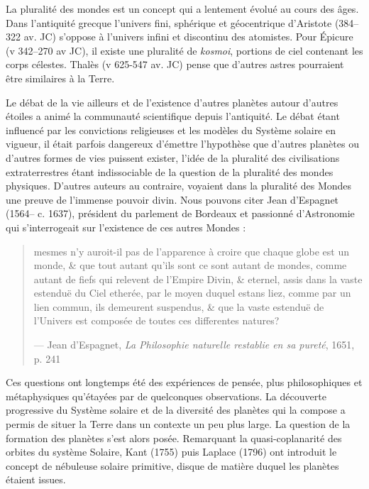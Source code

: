 La pluralité des mondes est un concept qui a lentement évolué au cours des âges. Dans l'antiquité grecque l'univers fini,
sphérique et géocentrique d'Aristote (384--322 av. JC) s'oppose à l'univers infini et discontinu des atomistes. Pour Épicure (v
342--270 av JC), il existe une pluralité de \textit{kosmoi}, portions de ciel contenant les corps célestes. Thalès (v 625-547
av. JC) pense que d'autres astres pourraient être similaires à la Terre. 

Le débat de la vie ailleurs et de l'existence d'autres planètes autour d'autres étoiles a animé la communauté scientifique
depuis l'antiquité. Le débat étant influencé par les convictions religieuses et les modèles du Système solaire en vigueur, il était
parfois dangereux d'émettre l'hypothèse que d'autres planètes ou d'autres formes de vies puissent exister, l'idée de la
pluralité des civilisations extraterrestres étant indissociable de la question de la pluralité des mondes physiques. D'autres auteurs au contraire, voyaient dans la pluralité des Mondes une preuve de l'immense pouvoir divin. Nous pouvons citer Jean d'Espagnet (1564-- c. 1637), président du parlement de Bordeaux et passionné d'Astronomie qui s'interrogeait sur l'existence de ces autres Mondes :
\begin{quote}
\og mesmes n'y auroit-il pas de l'apparence à croire que chaque globe est un monde, \& que tout autant qu'ils sont ce sont
autant de mondes, comme autant de fiefs qui relevent de l'Empire Divin, \& eternel, assis dans la vaste estenduë du Ciel
etherée, par le moyen duquel estans liez, comme par un lien commun, ils demeurent suspendus, \& que la vaste estenduë de
l'Univers est composée de toutes ces differentes natures?\fg 

--- Jean d'Espagnet, \textit{La Philosophie naturelle restablie en sa pureté}, 1651, p. 241 \cite{espagnet1651philosophie}
\end{quote}

Ces questions ont longtemps été des expériences de pensée, plus philosophiques et métaphysiques qu'étayées par de quelconques
observations. La découverte progressive du Système solaire et de la diversité des planètes qui la compose a permis de situer la
Terre dans un contexte un peu plus large. La question de la formation des planètes s'est alors posée. Remarquant la quasi-coplanarité des orbites du système Solaire, Kant (1755) puis Laplace (1796) ont introduit le concept de nébuleuse solaire
primitive, disque de matière duquel les planètes étaient issues. 

